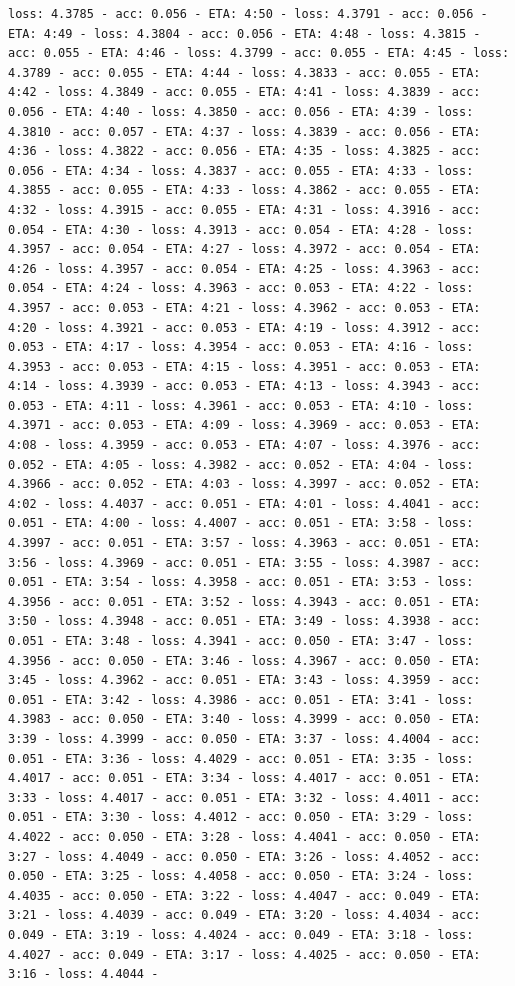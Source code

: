 \documentclass[11pt]{article}
\begin{document}
\begin{Verbatim}[commandchars=\\\{\}]
loss: 4.3785 - acc: 0.056 - ETA: 4:50 - loss: 4.3791 - acc: 0.056 - ETA: 4:49 - loss: 4.3804 - acc: 0.056 - ETA: 4:48 - loss: 4.3815 - acc: 0.055 - ETA: 4:46 - loss: 4.3799 - acc: 0.055 - ETA: 4:45 - loss: 4.3789 - acc: 0.055 - ETA: 4:44 - loss: 4.3833 - acc: 0.055 - ETA: 4:42 - loss: 4.3849 - acc: 0.055 - ETA: 4:41 - loss: 4.3839 - acc: 0.056 - ETA: 4:40 - loss: 4.3850 - acc: 0.056 - ETA: 4:39 - loss: 4.3810 - acc: 0.057 - ETA: 4:37 - loss: 4.3839 - acc: 0.056 - ETA: 4:36 - loss: 4.3822 - acc: 0.056 - ETA: 4:35 - loss: 4.3825 - acc: 0.056 - ETA: 4:34 - loss: 4.3837 - acc: 0.055 - ETA: 4:33 - loss: 4.3855 - acc: 0.055 - ETA: 4:33 - loss: 4.3862 - acc: 0.055 - ETA: 4:32 - loss: 4.3915 - acc: 0.055 - ETA: 4:31 - loss: 4.3916 - acc: 0.054 - ETA: 4:30 - loss: 4.3913 - acc: 0.054 - ETA: 4:28 - loss: 4.3957 - acc: 0.054 - ETA: 4:27 - loss: 4.3972 - acc: 0.054 - ETA: 4:26 - loss: 4.3957 - acc: 0.054 - ETA: 4:25 - loss: 4.3963 - acc: 0.054 - ETA: 4:24 - loss: 4.3963 - acc: 0.053 - ETA: 4:22 - loss: 4.3957 - acc: 0.053 - ETA: 4:21 - loss: 4.3962 - acc: 0.053 - ETA: 4:20 - loss: 4.3921 - acc: 0.053 - ETA: 4:19 - loss: 4.3912 - acc: 0.053 - ETA: 4:17 - loss: 4.3954 - acc: 0.053 - ETA: 4:16 - loss: 4.3953 - acc: 0.053 - ETA: 4:15 - loss: 4.3951 - acc: 0.053 - ETA: 4:14 - loss: 4.3939 - acc: 0.053 - ETA: 4:13 - loss: 4.3943 - acc: 0.053 - ETA: 4:11 - loss: 4.3961 - acc: 0.053 - ETA: 4:10 - loss: 4.3971 - acc: 0.053 - ETA: 4:09 - loss: 4.3969 - acc: 0.053 - ETA: 4:08 - loss: 4.3959 - acc: 0.053 - ETA: 4:07 - loss: 4.3976 - acc: 0.052 - ETA: 4:05 - loss: 4.3982 - acc: 0.052 - ETA: 4:04 - loss: 4.3966 - acc: 0.052 - ETA: 4:03 - loss: 4.3997 - acc: 0.052 - ETA: 4:02 - loss: 4.4037 - acc: 0.051 - ETA: 4:01 - loss: 4.4041 - acc: 0.051 - ETA: 4:00 - loss: 4.4007 - acc: 0.051 - ETA: 3:58 - loss: 4.3997 - acc: 0.051 - ETA: 3:57 - loss: 4.3963 - acc: 0.051 - ETA: 3:56 - loss: 4.3969 - acc: 0.051 - ETA: 3:55 - loss: 4.3987 - acc: 0.051 - ETA: 3:54 - loss: 4.3958 - acc: 0.051 - ETA: 3:53 - loss: 4.3956 - acc: 0.051 - ETA: 3:52 - loss: 4.3943 - acc: 0.051 - ETA: 3:50 - loss: 4.3948 - acc: 0.051 - ETA: 3:49 - loss: 4.3938 - acc: 0.051 - ETA: 3:48 - loss: 4.3941 - acc: 0.050 - ETA: 3:47 - loss: 4.3956 - acc: 0.050 - ETA: 3:46 - loss: 4.3967 - acc: 0.050 - ETA: 3:45 - loss: 4.3962 - acc: 0.051 - ETA: 3:43 - loss: 4.3959 - acc: 0.051 - ETA: 3:42 - loss: 4.3986 - acc: 0.051 - ETA: 3:41 - loss: 4.3983 - acc: 0.050 - ETA: 3:40 - loss: 4.3999 - acc: 0.050 - ETA: 3:39 - loss: 4.3999 - acc: 0.050 - ETA: 3:37 - loss: 4.4004 - acc: 0.051 - ETA: 3:36 - loss: 4.4029 - acc: 0.051 - ETA: 3:35 - loss: 4.4017 - acc: 0.051 - ETA: 3:34 - loss: 4.4017 - acc: 0.051 - ETA: 3:33 - loss: 4.4017 - acc: 0.051 - ETA: 3:32 - loss: 4.4011 - acc: 0.051 - ETA: 3:30 - loss: 4.4012 - acc: 0.050 - ETA: 3:29 - loss: 4.4022 - acc: 0.050 - ETA: 3:28 - loss: 4.4041 - acc: 0.050 - ETA: 3:27 - loss: 4.4049 - acc: 0.050 - ETA: 3:26 - loss: 4.4052 - acc: 0.050 - ETA: 3:25 - loss: 4.4058 - acc: 0.050 - ETA: 3:24 - loss: 4.4035 - acc: 0.050 - ETA: 3:22 - loss: 4.4047 - acc: 0.049 - ETA: 3:21 - loss: 4.4039 - acc: 0.049 - ETA: 3:20 - loss: 4.4034 - acc: 0.049 - ETA: 3:19 - loss: 4.4024 - acc: 0.049 - ETA: 3:18 - loss: 4.4027 - acc: 0.049 - ETA: 3:17 - loss: 4.4025 - acc: 0.050 - ETA: 3:16 - loss: 4.4044 - 
\end{Verbatim}
\end{document}
